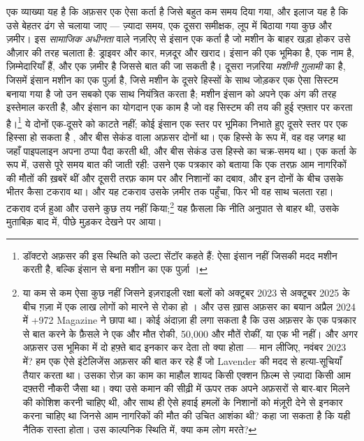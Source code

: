एक व्याख्या यह है कि अफ़सर एक ऐसा कर्ता है जिसे बहुत कम समय दिया गया, और इलाज यह है कि उसे बेहतर ढंग से चलाया जाए — ज़्यादा समय, एक दूसरा समीक्षक, लूप में बिठाया गया कुछ और ज़मीर। इस \emph{सामाजिक अधीनता} वाले नज़रिए से इंसान एक कर्ता है जो मशीन के बाहर खड़ा होकर उसे औज़ार की तरह चलाता है: ड्राइवर और कार, मज़दूर और खराद। इंसान की एक भूमिका है, एक नाम है, ज़िम्मेदारियाँ हैं, और एक ज़मीर है जिससे बात की जा सकती है। दूसरा नज़रिया \emph{मशीनी ग़ुलामी} का है, जिसमें इंसान मशीन का एक पुर्ज़ा है, जिसे मशीन के दूसरे हिस्सों के साथ जोड़कर एक ऐसा सिस्टम बनाया गया है जो उन सबको एक साथ नियंत्रित करता है; मशीन इंसान को अपने एक अंग की तरह इस्तेमाल करती है, और इंसान का योगदान एक काम है जो वह सिस्टम की तय की हुई रफ़्तार पर करता है।\footnote{डॉक्टरो अफ़सर की इस स्थिति को उल्टा सेंटॉर कहते हैं: ऐसा इंसान नहीं जिसकी मदद मशीन करती है, बल्कि इंसान से बना मशीन का एक पुर्ज़ा \autocite{doctorow2026reversecentaur}।} ये दोनों एक-दूसरे को काटते नहीं; कोई इंसान एक स्तर पर भूमिका निभाते हुए दूसरे स्तर पर एक हिस्सा हो सकता है \autocite[पठार 13, “The Apparatus of Capture”: ग़ुलामी तब है जब इंसान ख़ुद एक ऐसी मशीन के घटक पुर्ज़े होते हैं जिसे वे आपस में और दूसरी चीज़ों के साथ मिलकर बनाते हैं, किसी ऊँची इकाई के नियंत्रण और निर्देशन में; और अधीनता तब है जब वह ऊँची इकाई इंसान को एक कर्ता के रूप में गढ़ती है जो किसी नई बाहरी वस्तु से जुड़ा है, और वह वस्तु कोई जानवर, कोई औज़ार, या यहाँ तक कि कोई मशीन भी हो सकती है]{deleuze1987plateaus}, और बीस सेकंड वाला अफ़सर दोनों था। एक हिस्से के रूप में, वह वह जगह था जहाँ पाइपलाइन अपना ठप्पा पैदा करती थी, और बीस सेकंड उस हिस्से का चक्र-समय था। एक कर्ता के रूप में, उससे पूरे समय बात की जाती रही: उसने एक पत्रकार को बताया कि एक तरफ़ आम नागरिकों की मौतों की ख़बरें थीं और दूसरी तरफ़ काम पर और निशानों का दबाव, और इन दोनों के बीच उसके भीतर कैसा टकराव था। और यह टकराव उसके ज़मीर तक पहुँचा, फिर भी वह साथ चलता रहा। टकराव दर्ज हुआ और उसने कुछ तय नहीं किया;\footnote{या कम से कम ऐसा कुछ नहीं जिसने इज़राइली रक्षा बलों को अक्टूबर 2023 से अक्टूबर 2025 के बीच ग़ज़ा में एक लाख लोगों को मारने से रोका हो \autocite{gomezugarte2025uncertainty,acosta2026gaza,economist2025gaza}। और उस ख़ास अफ़सर का बयान अप्रैल 2024 में +972 Magazine ने छापा था। कोई अंदाज़ा ही लगा सकता है कि उस अफ़सर के एक पत्रकार से बात करने के फ़ैसले ने एक और मौत रोकी, 50,000 और मौतें रोकीं, या एक भी नहीं। और अगर अफ़सर उस भूमिका में दो हफ़्ते बाद इनकार कर देता तो क्या होता — मान लीजिए, नवंबर 2023 में? हम एक ऐसे इंटेलिजेंस अफ़सर की बात कर रहे हैं जो Lavender की मदद से हत्या-सूचियाँ तैयार करता था। उसका रोज़ का काम का माहौल शायद किसी एक्शन फ़िल्म से ज़्यादा किसी आम दफ़्तरी नौकरी जैसा था। क्या उसे कमान की सीढ़ी में ऊपर तक अपने अफ़सरों से बार-बार मिलने की कोशिश करनी चाहिए थी, और साथ ही ऐसे हवाई हमलों के निशानों को मंज़ूरी देने से इनकार करना चाहिए था जिनसे आम नागरिकों की मौत की उचित आशंका थी? कहा जा सकता है कि यही नैतिक रास्ता होता। उस काल्पनिक स्थिति में, क्या कम लोग मरते?} यह फ़ैसला कि नीति अनुपात से बाहर थी, उसके मुताबिक़ बाद में, पीछे मुड़कर देखने पर आया।


